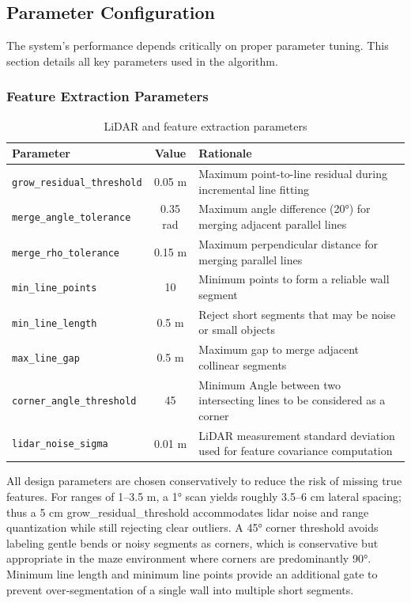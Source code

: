 \documentclass[11pt]{article}
\begin{document}
\subsection{Parameter Configuration}
\label{sec:parameter_configuration}

The system's performance depends critically on proper parameter tuning. This section details all key parameters used in the algorithm.

\subsubsection{Feature Extraction Parameters}

\begin{table}[htbp]
	\centering
	\caption{LiDAR and feature extraction parameters}
	\label{tab:lidar_params}
	\begin{tabular}{lcp{8cm}}
		\toprule
		\textbf{Parameter} & \textbf{Value} & \textbf{Rationale} \\
		\midrule
		\texttt{grow\_residual\_threshold} & 0.05 m & Maximum point-to-line residual during incremental line fitting \\
		\texttt{merge\_angle\_tolerance} & 0.35 rad & Maximum angle difference (20°) for merging adjacent parallel lines \\
		\texttt{merge\_rho\_tolerance} & 0.15 m & Maximum perpendicular distance for merging parallel lines \\
		\texttt{min\_line\_points} & 10 & Minimum points to form a reliable wall segment \\
		\texttt{min\_line\_length} & 0.5 m & Reject short segments that may be noise or small objects \\
		\texttt{max\_line\_gap} & 0.5 m & Maximum gap to merge adjacent collinear segments \\
		\texttt{corner\_angle\_threshold} & 45 & Minimum Angle between two intersecting lines to be considered as a corner\\
		\texttt{lidar\_noise\_sigma} & 0.01 m & LiDAR measurement standard deviation used for feature covariance computation \\
		\bottomrule
	\end{tabular}
\end{table}

All design parameters are chosen conservatively to reduce the risk of missing true features. For ranges of 1–3.5 m, a 1° scan yields roughly 3.5–6 cm lateral spacing; thus a 5 cm grow\_residual\_threshold accommodates lidar noise and range quantization while still rejecting clear outliers. A 45° corner threshold avoids labeling gentle bends or noisy segments as corners, which is conservative but appropriate in the maze environment where corners are predominantly 90°. Minimum line length and minimum line points provide an additional gate to prevent over‑segmentation of a single wall into multiple short segments.
\end{document}
